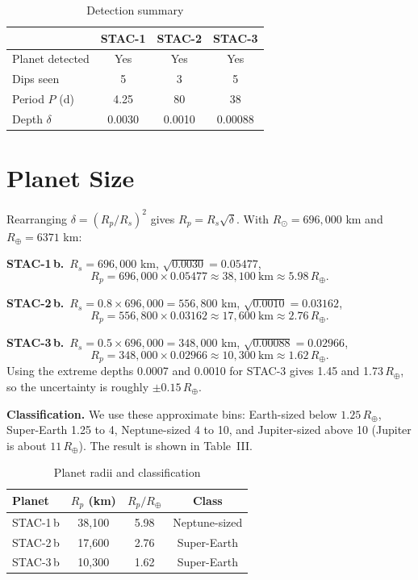 \documentclass[10pt,twocolumn]{article}
\newcommand{\Rearth}{R_{\oplus}}
\begin{document}
\begin{table}[h]
\centering
\caption{Detection summary}
\small
\begin{tabular}{lccc}
\toprule
 & STAC-1 & STAC-2 & STAC-3\\
\midrule
Planet detected & Yes & Yes & Yes\\
Dips seen & 5 & 3 & 5\\
Period $P$ (d) & 4.25 & 80 & 38\\
Depth $\delta$ & 0.0030 & 0.0010 & 0.00088\\
\bottomrule
\end{tabular}
\end{table}

\section{Planet Size}
Rearranging $\delta=(R_p/R_s)^2$ gives $R_p=R_s\sqrt{\delta}$. With $R_\odot=696{,}000$ km and $R_\oplus=6371$ km:

\textbf{STAC-1\,b.}\ $R_s=696{,}000$ km, $\sqrt{0.0030}=0.05477$,
\begin{equation}
R_p = 696{,}000\times0.05477 \approx 38{,}100\ \text{km}\approx 5.98\,\Rearth.
\end{equation}

\textbf{STAC-2\,b.}\ $R_s=0.8\times696{,}000=556{,}800$ km, $\sqrt{0.0010}=0.03162$,
\begin{equation}
R_p = 556{,}800\times0.03162 \approx 17{,}600\ \text{km}\approx 2.76\,\Rearth.
\end{equation}

\textbf{STAC-3\,b.}\ $R_s=0.5\times696{,}000=348{,}000$ km, $\sqrt{0.00088}=0.02966$,
\begin{equation}
R_p = 348{,}000\times0.02966 \approx 10{,}300\ \text{km}\approx 1.62\,\Rearth.
\end{equation}
Using the extreme depths 0.0007 and 0.0010 for STAC-3 gives 1.45 and 1.73\,$\Rearth$, so the uncertainty is roughly $\pm0.15\,\Rearth$.

\textbf{Classification.} We use these approximate bins: Earth-sized below $1.25\,\Rearth$, Super-Earth 1.25 to 4, Neptune-sized 4 to 10, and Jupiter-sized above 10 (Jupiter is about $11\,\Rearth$). The result is shown in Table~III.

\begin{table}[h]
\centering
\caption{Planet radii and classification}
\small
\begin{tabular}{lccc}
\toprule
Planet & $R_p$ (km) & $R_p/\Rearth$ & Class\\
\midrule
STAC-1\,b & 38,100 & 5.98 & Neptune-sized\\
STAC-2\,b & 17,600 & 2.76 & Super-Earth\\
STAC-3\,b & 10,300 & 1.62 & Super-Earth\\
\bottomrule
\end{tabular}
\end{table}
\end{document}
